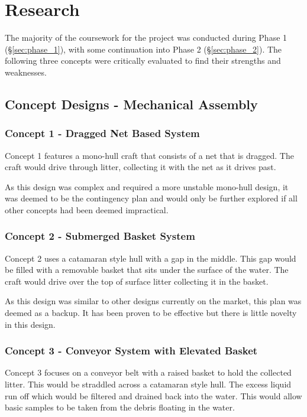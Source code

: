 \documentclass [12pt]{article}
\begin{document}
\section{Research}\label{sec:research}

The majority of the coursework for the project was conducted during Phase 1 (§\ref{sec:phase_1}), with some continuation into Phase 2 (§\ref{sec:phase_2}). The following three concepts were critically evaluated to find their strengths and weaknesses. 

\subsection{Concept Designs - Mechanical Assembly}
\subsubsection{Concept 1 - Dragged Net Based System}
Concept 1 features a mono-hull craft that consists of a net that is dragged. The craft would drive through litter, collecting it with the net as it drives past. 

As this design was complex and required a more unstable mono-hull design, it was deemed to be the contingency plan and would only be further explored if all other concepts had been deemed impractical.

\subsubsection{Concept 2 - Submerged Basket System}
Concept 2 uses a catamaran style hull with a gap in the middle. This gap would be filled with a removable basket that sits under the surface of the water. The craft would drive over the top of surface litter collecting it in the basket.  

As this design was similar to other designs currently on the market, this plan was deemed as a backup. It has been proven to be effective but there is little novelty in this design. 

\subsubsection{Concept 3 - Conveyor System with Elevated Basket}
Concept 3 focuses on a conveyor belt with a raised basket to hold the collected litter. This would be straddled across a catamaran style hull. The excess liquid run off which would be filtered and drained back into the water. This would allow basic samples to be taken from the debris floating in the water. 
\end{document}
